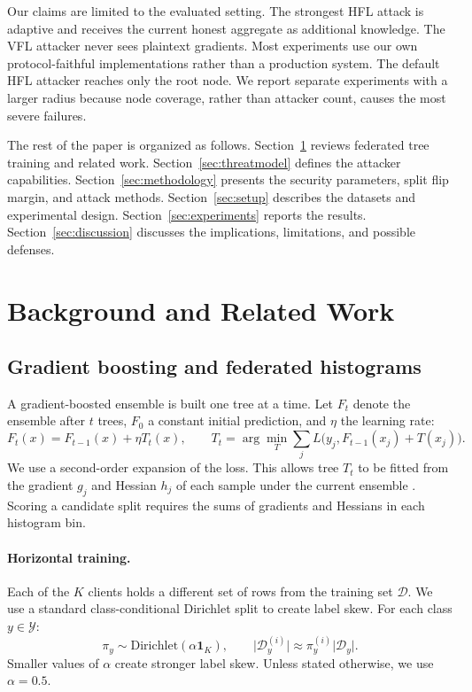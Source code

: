 \documentclass[11pt]{article}
\begin{document}
Our claims are limited to the evaluated setting. The strongest HFL attack is adaptive and receives the current honest aggregate as additional knowledge. The VFL attacker never sees plaintext gradients. Most experiments use our own protocol-faithful implementations rather than a production system. The default HFL attacker reaches only the root node. We report separate experiments with a larger radius because node coverage, rather than attacker count, causes the most severe failures.

The rest of the paper is organized as follows. Section~\ref{sec:background} reviews federated tree training and related work. Section~\ref{sec:threatmodel} defines the attacker capabilities. Section~\ref{sec:methodology} presents the security parameters, split flip margin, and attack methods. Section~\ref{sec:setup} describes the datasets and experimental design. Section~\ref{sec:experiments} reports the results. Section~\ref{sec:discussion} discusses the implications, limitations, and possible defenses.

\section{Background and Related Work}
\label{sec:background}

\subsection{Gradient boosting and federated histograms}

A gradient-boosted ensemble is built one tree at a time. Let $F_t$ denote the ensemble after $t$ trees, $F_0$ a constant initial prediction, and $\eta$ the learning rate:
\begin{equation}
F_t(x) = F_{t-1}(x) + \eta T_t(x), \qquad
T_t = \arg\min_T \sum_j L\bigl(y_j,F_{t-1}(x_j)+T(x_j)\bigr).
\label{eq:boosting}
\end{equation}
We use a second-order expansion of the loss. This allows tree $T_t$ to be fitted from the gradient $g_j$ and Hessian $h_j$ of each sample under the current ensemble \cite{chen2016xgboost}. Scoring a candidate split requires the sums of gradients and Hessians in each histogram bin.

\paragraph{Horizontal training.}
Each of the $K$ clients holds a different set of rows from the training set $\mathcal{D}$. We use a standard class-conditional Dirichlet split to create label skew. For each class $y\in\mathcal{Y}$:
\begin{equation}
\pi_y \sim \mathrm{Dirichlet}(\alpha\mathbf{1}_K), \qquad
\bigl|\mathcal{D}^{(i)}_y\bigr| \approx \pi_y^{(i)}\lvert\mathcal{D}_y\rvert.
\label{eq:dirichlet}
\end{equation}
Smaller values of $\alpha$ create stronger label skew. Unless stated otherwise, we use $\alpha=0.5$.
\end{document}

